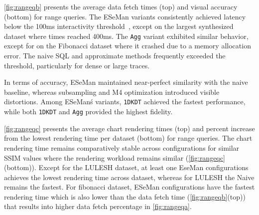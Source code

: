 \begin{refsection}

\autoref{fig:rangeqb} presents the average data fetch times (top) and visual accuracy (bottom) for range queries. The ESeMan variants consistently achieved latency below the 100ms interactivity threshold~\cite{battle2019role}, except on the largest synthesized dataset where times reached 400ms. The \texttt{Agg} variant exhibited similar behavior, except for on the Fibonacci dataset where it crashed due to a memory allocation error. The naive SQL and approximate methods frequently exceeded the threshold, particularly for dense or large traces.

In terms of accuracy, ESeMan maintained near-perfect similarity with the naive baseline, whereas subsampling and M4 optimization introduced visible distortions. Among ESeMan\'s variants, \texttt{1DKDT} achieved the fastest performance, while both \texttt{1DKDT} and \texttt{Agg} provided the highest fidelity.


\autoref{fig:rangeqc} presents the average chart rendering times (top) and percent increase from the lowest rendering time per dataset (bottom) for range queries. The chart rendering time remains comparatively stable across configurations for similar SSIM values where the rendering workload remains similar (\autoref{fig:rangeqc}(bottom)). Except for the LULESH dataset, at least one EseMan configurations achieves the lowest rendering time across dataset, whereas for LULESH the Naive remains the fastest. For fibonacci dataset, ESeMan configurations have the fastest rendering time which is also lower than the data fetch time (\autoref{fig:rangeqb}(top)) that results into higher data fetch percentage in \autoref{fig:rangeqa}.


\end{refsection}
